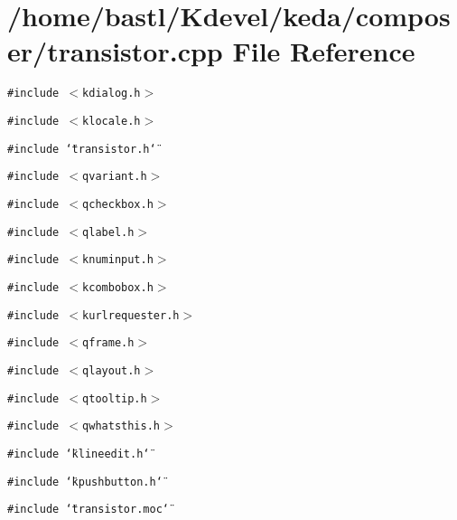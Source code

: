 \section{/home/bastl/Kdevel/keda/composer/transistor.cpp File Reference}
\label{transistor_8cpp}
{\tt \#include $<$kdialog.h$>$}\par
{\tt \#include $<$klocale.h$>$}\par
{\tt \#include \char`\"{}transistor.h\char`\"{}}\par
{\tt \#include $<$qvariant.h$>$}\par
{\tt \#include $<$qcheckbox.h$>$}\par
{\tt \#include $<$qlabel.h$>$}\par
{\tt \#include $<$knuminput.h$>$}\par
{\tt \#include $<$kcombobox.h$>$}\par
{\tt \#include $<$kurlrequester.h$>$}\par
{\tt \#include $<$qframe.h$>$}\par
{\tt \#include $<$qlayout.h$>$}\par
{\tt \#include $<$qtooltip.h$>$}\par
{\tt \#include $<$qwhatsthis.h$>$}\par
{\tt \#include \char`\"{}klineedit.h\char`\"{}}\par
{\tt \#include \char`\"{}kpushbutton.h\char`\"{}}\par
{\tt \#include \char`\"{}transistor.moc\char`\"{}}\par
